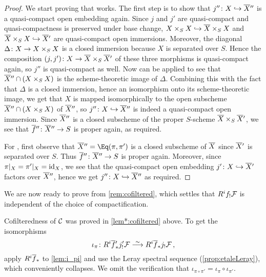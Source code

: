 \documentclass[a4paper, 10pt, oneside, DIV=9, chapterprefix=true, numbers=enddot, bibliography=totoc]{scrbook}
\begin{document}
\begin{proof}
	We start proving that  works. The first step is to show that $j''\colon X\monomorphism\ov{X}''$ is a quasi-compact open embedding again. Since $j$ and $j'$ are quasi-compact and quasi-compactness is preserved under base change, $X\times_SX\monomorphism \ov{X}\times_SX$ and $\ov{X}\times_SX\monomorphism \ov{X}'$ are quasi-compact open immersions. Moreover, the diagonal  $\Delta\colon X\morphism X\times_SX$ is a closed immersion because $X$ is separated over $S$. Hence the composition $(j,j')\colon X\morphism\ov{X}\times_S\ov{X}'$ of these three morphisms is quasi-compact again, so $j''$ is quasi-compact as well. Now \cite[]{stacks-project} can be applied to see that $\ov{X}''\cap (X\times_SX)$ is the scheme-theoretic image of $\Delta$. Combining this with the fact that $\Delta$ is a closed immersion, hence an isomorphism onto its scheme-theoretic image, we get that $X$ is mapped isomorphically to the open subscheme $\ov{X}''\cap (X\times_SX)$ of $\ov{X}''$, so $j''\colon X\monomorphism\ov{X}''$ is indeed a quasi-compact open immersion. Since $\ov{X}''$ is a closed subscheme of the proper $S$-scheme $\ov{X}\times_S\ov{X}'$, we see that $\ov{f}''\colon\ov{X}''\morphism S$ is proper again, as required.
	
	For , first observe that $\ov{X}''=\Eq(\pi,\pi')$ is a closed subscheme of $\ov{X}$ since $\ov{X}'$ is separated over $S$. Thus $\ov{f}''\colon\ov{X}''\morphism S$ is proper again. Moreover, since $\pi|_X=\pi'|_X=\operatorname{id}_X$, we see that the quasi-compact open embedding $j'\colon X\monomorphism \ov{X}'$ factors over $\ov{X}''$, hence we get $j''\colon X\monomorphism\ov{X}''$ as required.
\end{proof}
We are now ready to prove \itememph{\boxtimes} from \cref{rem:cofiltered}, which settles that $R^if_!\mathcal{F}$ is independent of the choice of compactification.
\begin{proof*}
	Cofilteredness of $\mathcal{C}$ was proved in \cref{lem*:cofiltered} above. To get the isomorphisms
	\begin{equation*}
		\iota_\pi\colon R^i\ov{f}'_*j'_!\Ff\isomorphism R^i\ov{f}_*j_!\Ff\,,
	\end{equation*}
	apply $R^i\ov{f}_*$ to \cref{lem:i_pi} and use the Leray spectral sequence (\cref{prop:etaleLeray}), which conveniently collapses. We omit the verification that $\iota_{\pi\circ \pi'}=\iota_\pi\circ \iota_{\pi'}$.
\end{proof*}
\end{document}
